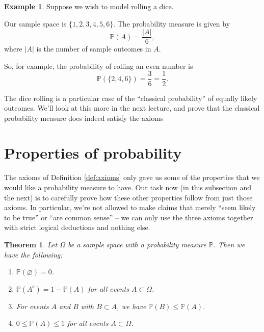 \documentclass[
  a4paper,
]{book}
\providecommand{\tightlist}{%
  \setlength{\itemsep}{0pt}\setlength{\parskip}{0pt}}
\newtheorem{theorem}{Theorem}[chapter]
\theoremstyle{definition}
\theoremstyle{definition}
\newtheorem{example}{Example}[chapter]
\theoremstyle{definition}
\theoremstyle{definition}
\theoremstyle{remark}
\begin{document}
\begin{example}
Suppose we wish to model rolling a dice.

Our sample space is \(\{1,2,3,4,5,6\}\). The probability measure is given by
\[ \mathbb P(A) = \frac{|A|}{6} , \]
where \(|A|\) is the number of sample outcomes in \(A\).

So, for example, the probability of rolling an even number is
\[ \mathbb P(\{2,4,6\}) = \frac36 = \frac12 . \]
\end{example}

The dice rolling is a particular case of the ``classical probability'' of equally likely outcomes. We'll look at this more in the next lecture, and prove that the classical probability measure does indeed satisfy the axioms

\hypertarget{prob-properties}{%
\section{Properties of probability}\label{prob-properties}}

The axioms of Definition \ref{def:axioms} only gave us some of the properties that we would like a probability measure to have. Our task now (in this subsection and the next) is to carefully prove how these other properties follow from just those axioms. In particular, we're not allowed to make claims that merely ``seem likely to be true'' or ``are common sense'' -- we can only use the three axioms together with strict logical deductions and nothing else.

\begin{theorem}

Let \(\Omega\) be a sample space with a probability measure \(\mathbb P\). Then we have the following:

\begin{enumerate}
\def\labelenumi{\arabic{enumi}.}
\tightlist
\item
  \(\mathbb P(\varnothing) = 0\).
\item
  \(\mathbb P(A^\mathsf{c}) = 1 - \mathbb P(A)\) for all events \(A \subset \Omega\).
\item
  For events \(A\) and \(B\) with \(B \subset A\), we have \(\mathbb P(B) \leq \mathbb P(A)\).
\item
  \(0 \leq \mathbb P(A) \leq 1\) for all events \(A \subset \Omega\).
\end{enumerate}

\end{theorem}
\end{document}
